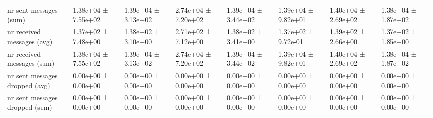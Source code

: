 \begin{tabular}{llllllll}
 nr sent messages (sum)             & 1.38e+04 ± 7.55e+02 & 1.39e+04 ± 3.13e+02 & 2.74e+04 ± 7.20e+02 & 1.39e+04 ± 3.44e+02 & 1.39e+04 ± 9.82e+01 & 1.40e+04 ± 2.69e+02 & 1.38e+04 ± 1.87e+02 \\
 nr received messages (avg)         & 1.37e+02 ± 7.48e+00 & 1.38e+02 ± 3.10e+00 & 2.71e+02 ± 7.12e+00 & 1.38e+02 ± 3.41e+00 & 1.37e+02 ± 9.72e-01 & 1.39e+02 ± 2.66e+00 & 1.37e+02 ± 1.85e+00 \\
 nr received messages (sum)         & 1.38e+04 ± 7.55e+02 & 1.39e+04 ± 3.13e+02 & 2.74e+04 ± 7.20e+02 & 1.39e+04 ± 3.44e+02 & 1.39e+04 ± 9.82e+01 & 1.40e+04 ± 2.69e+02 & 1.38e+04 ± 1.87e+02 \\
 nr sent messages dropped (avg)     & 0.00e+00 ± 0.00e+00 & 0.00e+00 ± 0.00e+00 & 0.00e+00 ± 0.00e+00 & 0.00e+00 ± 0.00e+00 & 0.00e+00 ± 0.00e+00 & 0.00e+00 ± 0.00e+00 & 0.00e+00 ± 0.00e+00 \\
 nr sent messages dropped (sum)     & 0.00e+00 ± 0.00e+00 & 0.00e+00 ± 0.00e+00 & 0.00e+00 ± 0.00e+00 & 0.00e+00 ± 0.00e+00 & 0.00e+00 ± 0.00e+00 & 0.00e+00 ± 0.00e+00 & 0.00e+00 ± 0.00e+00 \\
\hline
\end{tabular}